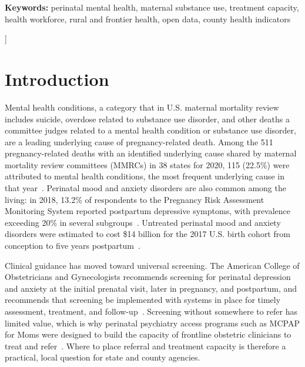 \documentclass[10pt,twocolumn,letterpaper]{article}
\begin{document}
\begin{@twocolumnfalse}
\begin{center}
\begin{minipage}{0.80\textwidth}
\vspace{4pt}
\noindent\textbf{Keywords:} perinatal mental health, maternal substance use, treatment capacity, health workforce, rural and frontier health, open data, county health indicators
\end{minipage}
\end{center}
\vspace{14pt}
\end{@twocolumnfalse}
]
{\renewcommand{\thefootnote}{$*$}}

\section{Introduction}

Mental health conditions, a category that in U.S. maternal mortality review includes suicide, overdose related to substance use disorder, and other deaths a committee judges related to a mental health condition or substance use disorder, are a leading underlying cause of pregnancy-related death. Among the 511 pregnancy-related deaths with an identified underlying cause shared by maternal mortality review committees (MMRCs) in 38 states for 2020, 115 (22.5\%) were attributed to mental health conditions, the most frequent underlying cause in that year~\cite{cdc_mmrc2020}. Perinatal mood and anxiety disorders are also common among the living: in 2018, 13.2\% of respondents to the Pregnancy Risk Assessment Monitoring System reported postpartum depressive symptoms, with prevalence exceeding 20\% in several subgroups~\cite{bauman2020}. Untreated perinatal mood and anxiety disorders were estimated to cost \$14 billion for the 2017 U.S. birth cohort from conception to five years postpartum~\cite{luca2020}.

Clinical guidance has moved toward universal screening. The American College of Obstetricians and Gynecologists recommends screening for perinatal depression and anxiety at the initial prenatal visit, later in pregnancy, and postpartum, and recommends that screening be implemented with systems in place for timely assessment, treatment, and follow-up~\cite{acog_cpg4}. Screening without somewhere to refer has limited value, which is why perinatal psychiatry access programs such as MCPAP for Moms were designed to build the capacity of frontline obstetric clinicians to treat and refer~\cite{byatt2016}. Where to place referral and treatment capacity is therefore a practical, local question for state and county agencies.
\end{document}
